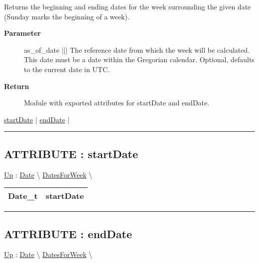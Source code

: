 \par
Returns the beginning and ending dates for the week surrounding the given date (Sunday marks the beginning of a week).

\par
\begin{description}
\item [\textbf{Parameter}] as\_of\_date ||| The reference date from which the week will be calculated. This date must be a date within the Gregorian calendar. Optional, defaults to the current date in UTC.
\item [\textbf{Return}] Module with exported attributes for startDate and endDate.
\end{description}

\hyperlink{ecldoc:date.datesforweek.result.startdate}{startDate}  |
\hyperlink{ecldoc:date.datesforweek.result.enddate}{endDate}  |

\rule{\linewidth}{0.5pt}

\subsection*{ATTRIBUTE : startDate}
\hypertarget{ecldoc:date.datesforweek.result.startdate}{}
\hyperlink{ecldoc:date.datesforweek}{Up} :
\hspace{0pt} \hyperlink{ecldoc:Date}{Date} \textbackslash 
\hspace{0pt} \hyperlink{ecldoc:date.datesforweek}{DatesForWeek} \textbackslash 

{\renewcommand{\arraystretch}{1.5}
\begin{tabularx}{\textwidth}{|>{\raggedright\arraybackslash}l|X|}
\hline
\hspace{0pt}Date\_t & startDate \\
\hline
\end{tabularx}
}

\par


\rule{\linewidth}{0.5pt}
\subsection*{ATTRIBUTE : endDate}
\hypertarget{ecldoc:date.datesforweek.result.enddate}{}
\hyperlink{ecldoc:date.datesforweek}{Up} :
\hspace{0pt} \hyperlink{ecldoc:Date}{Date} \textbackslash 
\hspace{0pt} \hyperlink{ecldoc:date.datesforweek}{DatesForWeek} \textbackslash 

